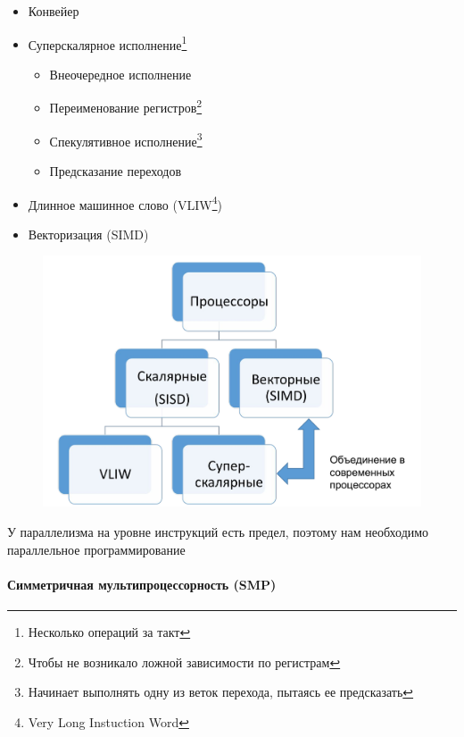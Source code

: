 \documentclass[10pt,a4paper,oneside,titlepage]{article}
\theoremstyle{plain}
\theoremstyle{defenition}
\begin{document}
\begin{itemize}
	\item Конвейер
	
	\item Суперскалярное исполнение\footnote{Несколько операций за такт}
	
	\begin{itemize}
		\item Внеочередное исполнение
		
		\item Переименование регистров\footnote{Чтобы не возникало ложной зависимости по регистрам}
		
		\item Спекулятивное исполнение\footnote{Начинает выполнять одну из веток перехода, пытаясь ее предсказать}
		
		\item Предсказание переходов
	\end{itemize}

    \item Длинное машинное слово (VLIW\footnote{Very Long Instuction Word})
    
    \item Векторизация (SIMD)
\end{itemize}

\begin{figure}[h]
	\centering
	\includegraphics*[width=0.7\linewidth]{pictures/Processors}
	\caption{}
	\label{fig:processors}
\end{figure}

У параллелизма на уровне инструкций есть предел, поэтому нам необходимо параллельное программирование

\paragraph{Симметричная мультипроцессорность (SMP)}
\end{document}
